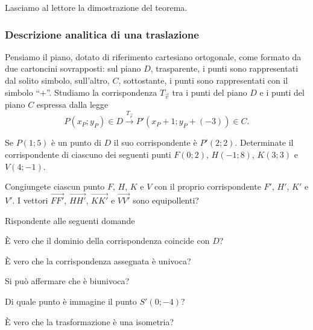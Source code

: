 Lasciamo al lettore la dimostrazione del teorema.

\subsubsection{Descrizione analitica di una traslazione}

Pensiamo il piano, dotato di riferimento cartesiano ortogonale, come formato da due cartoncini sovrapposti: sul piano $D$, trasparente, i punti sono rappresentati dal solito simbolo, sull'altro, $C$, sottostante, i punti sono rappresentati con il simbolo ``+''.
Studiamo la corrispondenza $T_{\vec{v}}$ tra i punti del piano $D$ e i punti del piano $C$ espressa dalla legge
\[P(x_P;y_P)\in D \overset{T_{\vec{v}}}\rightarrow P'(x_P+1;y_P+(-3))\in C.\]

Se $P(1;5)$ è un punto di $D$ il suo corrispondente è $P'(2;2)$. Determinate il corrispondente di ciascuno dei seguenti punti $F(0;2)$, $H(-1;8)$, $K(3;3)$ e $V(4;-1)$.

Congiungete ciascun punto $F$, $H$, $K$ e $V$ con il proprio corrispondente $F'$, $H'$, $K'$ e $V'$. I vettori $\vec{FF'}$, $\vec{HH'}$, $\vec{KK'}$ e $\vec{VV'}$ sono equipollenti?

Rispondente alle seguenti domande
\begin{itemize*}
\item \`E vero che il dominio della corrispondenza coincide con $D$?
\item \`E vero che la corrispondenza assegnata è univoca?
\item Si può affermare che è biunivoca?
\item Di quale punto è immagine il punto $S'(0;-4)$?
\item \`E vero che la trasformazione è una isometria?
\end{itemize*}

\begin{comment}
51   Nel piano sono assegnati i tre punti A, B, A’; il punto A’ è immagine di A in una traslazione; dopo aver determinato il vettore della traslazione costruite l’immagine del triangolo ABA’. (figura1)
52   Determinate l’immagine del parallelogrammo ABCD nella traslazione di vettore .
53   Dati due punti distinti A e B e il vettore  della figura 2, detti A’ e B’ i punti immagine di A e B nella traslazione di vettore , rispondete alle questioni:
[A] di che natura è il quadrilatero ABB’A’ ?
[B] può succedere che il quadrilatero in questione sia un rettangolo? E un rombo?
[C] cosa succede se AB è parallelo al vettore ?
54   Come dobbiamo assegnare due segmenti AB e A’B’ perché siano corrispondenti in una traslazione? È unica la traslazione che associa ad AB il segmento A’B’?
\end{comment}

